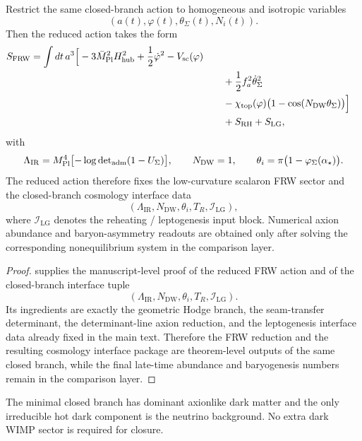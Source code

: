 \begin{theorem}
\label{thm:frw-cosmology-derivation}
Restrict the same closed-branch action to homogeneous and isotropic variables
\[
(a(t),\varphi(t),\theta_\Sigma(t),N_i(t)).
\]
Then the reduced action takes the form
\[
\begin{aligned}
S_{\mathrm{FRW}}
=
\int dt\,a^3\Big[
-3\bar M_{\mathrm{Pl}}^2H_{\mathrm{hub}}^2
+\frac12\dot\varphi^2
-V_{\mathrm{sc}}(\varphi)
\\
&\qquad
+\frac12 f_a^2\dot\theta_\Sigma^2
\\
&\qquad
-\chi_{\mathrm{top}}(\varphi)\bigl(1-\cos(N_{\mathrm{DW}}\theta_\Sigma)\bigr)
\Big]
\\
&\qquad
+S_{\mathrm{RH}}+S_{\mathrm{LG}},
\end{aligned}
\]
with
\[
\Lambda_{\mathrm{IR}}
=
M_{\mathrm{Pl}}^4\bigl[-\log\det\nolimits_{\mathrm{adm}}(1-U_\Sigma)\bigr],
\qquad
N_{\mathrm{DW}}=1,
\qquad
\theta_i=\pi\bigl(1-\varphi_{\Sigma}(\alpha_\star)\bigr).
\]
The reduced action therefore fixes the low-curvature scalaron FRW sector and the closed-branch
cosmology interface data
\[
(\Lambda_{\mathrm{IR}},N_{\mathrm{DW}},\theta_i,T_R,\mathcal I_{\mathrm{LG}}),
\]
where $\mathcal I_{\mathrm{LG}}$ denotes the reheating / leptogenesis input block. Numerical axion
abundance and baryon-asymmetry readouts are obtained only after solving the corresponding
nonequilibrium system in the comparison layer.
\end{theorem}

\begin{proof}
 supplies the manuscript-level proof of the reduced FRW action
and of the closed-branch interface tuple
\[
(\Lambda_{\mathrm{IR}},N_{\mathrm{DW}},\theta_i,T_R,\mathcal I_{\mathrm{LG}}).
\]
Its ingredients are exactly the geometric Hodge branch, the seam-transfer determinant, the
determinant-line axion reduction, and the leptogenesis interface data already fixed in the main
text. Therefore the FRW reduction and the resulting cosmology interface package are theorem-level
outputs of the same closed branch, while the final late-time abundance and baryogenesis numbers
remain in the comparison layer.
\end{proof}

\begin{corollary}
The minimal closed branch has dominant axionlike dark matter and the only
irreducible hot dark component is the neutrino background. No extra dark WIMP sector is required
for closure.
\end{corollary}

